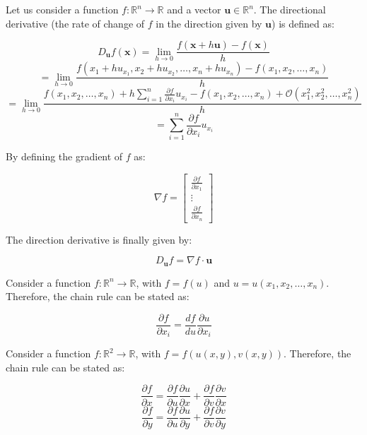 \documentclass[12pt]{article}
\begin{document}
\begin{definition}
    Let us consider a function $f : \mathbb{R}^n \to \mathbb{R}$ and a vector $\mathbf{u} \in \mathbb{R}^n$. The directional derivative (the rate of change of $f$ in the direction given by $\mathbf{u}$) is defined as:

    \[ D_{\mathbf{u}}f(\mathbf{x}) = \lim_{h \to 0} \frac{f(\mathbf{x} + h\mathbf{u}) - f(\mathbf{x})}{h} \]
    \[ = \lim_{h \to 0} \frac{f(x_1 + hu_{x_1}, x_2 + hu_{x_2}, \dots, x_n + hu_{x_n}) - f(x_1, x_2, \dots, x_n)}{h} \]
    \[ = \lim_{h \to 0} \frac{f(x_1, x_2, \dots, x_n) + h\sum_{i = 1}^n \frac{\partial f}{\partial x_i}u_{x_i} - f(x_1, x_2, \dots, x_n) + \mathcal{O}(x_1^2, x_2^2, \dots, x_n^2)}{h} \]
    \[ = \sum_{i = 1}^n \frac{\partial f}{\partial x_i}u_{x_i} \]

    By defining the gradient of $f$ as:

    \[ \nabla f = \begin{bmatrix}
        \frac{\partial f}{\partial x_1} \\
        \vdots \\
        \frac{\partial f}{\partial x_n}
    \end{bmatrix} \]

    The direction derivative is finally given by:

    \[ D_{\mathbf{u}}f = \nabla f \cdot \mathbf{u} \]
\end{definition}

\begin{theorem}
    Consider a function $f : \mathbb{R}^n \to \mathbb{R}$, with $f = f(u)$ and $u = u(x_1, x_2, \dots, x_n)$. Therefore, the chain rule can be stated as:

    \[ \frac{\partial f}{\partial x_i} = \frac{df}{du} \frac{\partial u}{\partial x_i} \]
\end{theorem}

\begin{theorem}
    Consider a function $f : \mathbb{R}^2 \to \mathbb{R}$, with $f = f(u(x, y), v(x, y))$. Therefore, the chain rule can be stated as:

    \[ \frac{\partial f}{\partial x} = \frac{\partial f}{\partial u}\frac{\partial u}{\partial x} + \frac{\partial f}{\partial v}\frac{\partial v}{\partial x} \]
    \[ \frac{\partial f}{\partial y} = \frac{\partial f}{\partial u}\frac{\partial u}{\partial y} + \frac{\partial f}{\partial v}\frac{\partial v}{\partial y} \]
\end{theorem}
\end{document}
